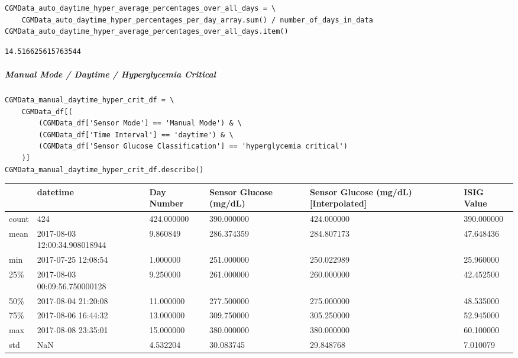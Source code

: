 \begin{verbatim}
CGMData_auto_daytime_hyper_average_percentages_over_all_days = \
    CGMData_auto_daytime_hyper_percentages_per_day_array.sum() / number_of_days_in_data
CGMData_auto_daytime_hyper_average_percentages_over_all_days.item()
\end{verbatim}

\begin{verbatim}
14.516625615763544
\end{verbatim}

\subparagraph{Manual Mode / Daytime / Hyperglycemia Critical}

\begin{verbatim}
CGMData_manual_daytime_hyper_crit_df = \
    CGMData_df[(
        (CGMData_df['Sensor Mode'] == 'Manual Mode') & \
        (CGMData_df['Time Interval'] == 'daytime') & \
        (CGMData_df['Sensor Glucose Classification'] == 'hyperglycemia critical')
    )]
CGMData_manual_daytime_hyper_crit_df.describe()
\end{verbatim}

\bigskip\noindent
\begin{tabular}{p{}p{}p{}p{}p{}p{}}
\toprule
 & datetime & Day Number & Sensor Glucose (mg/dL) & Sensor Glucose (mg/dL) [Interpolated] & ISIG Value \\
\hline
count & 424 & 424.000000 & 390.000000 & 424.000000 & 390.000000 \\
\hline
mean & 2017-08-03 12:00:34.908018944 & 9.860849 & 286.374359 & 284.807173 & 47.648436 \\
\hline
min & 2017-07-25 12:08:54 & 1.000000 & 251.000000 & 250.022989 & 25.960000 \\
\hline
25\% & 2017-08-03 00:09:56.750000128 & 9.250000 & 261.000000 & 260.000000 & 42.452500 \\
\hline
50\% & 2017-08-04 21:20:08 & 11.000000 & 277.500000 & 275.000000 & 48.535000 \\
\hline
75\% & 2017-08-06 16:44:32 & 13.000000 & 309.750000 & 305.250000 & 52.945000 \\
\hline
max & 2017-08-08 23:35:01 & 15.000000 & 380.000000 & 380.000000 & 60.100000 \\
\hline
std & NaN & 4.532204 & 30.083745 & 29.848768 & 7.010079 \\
\hline
\bottomrule
\end{tabular}


